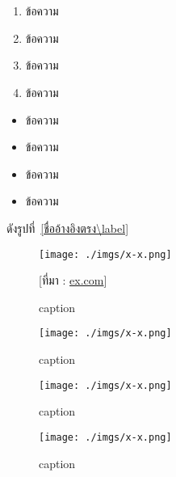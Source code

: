 \pagebreak

\chapter{}

\section{}

\subsection{}

\subsubsection{}

\textbf{}

\underline{}

\begin{enumerate}
  \item ข้อความ
  \item ข้อความ
  \item ข้อความ
  \item ข้อความ
\end{enumerate}

\begin{itemize}
  \item ข้อความ
  \item ข้อความ
  \item ข้อความ
  \item ข้อความ
\end{itemize}


ดังรูปที่~\ref{ชื่ออ้างอิงตรง\label}


\begin{figure}[H]\centering
    \setlength{\fboxrule}{0.2mm}  %
    \setlength{\fboxsep}{1cm}     %
    \fbox{}                       %
    \texttt{[image: ./imgs/x-x.png]}
    \caption{caption}\label{fig:x-x}
    \small [ที่มา : \url{ex.com}]
\end{figure}

\begin{figure}[H]\centering
    \texttt{[image: ./imgs/x-x.png]}
    \caption{caption}\label{fig:x-x}
\end{figure}

\begin{figure}[H]\centering
    \begin{minipage}{.3\textwidth}
      \centering
      \texttt{[image: ./imgs/x-x.png]}
      \caption{caption}\label{fig:3-4}
    \end{minipage}
    \begin{minipage}{.3\textwidth}
      \centering
      \texttt{[image: ./imgs/x-x.png]}
      \caption{caption}\label{fig:3-5}
    \end{minipage}
  \end{figure}